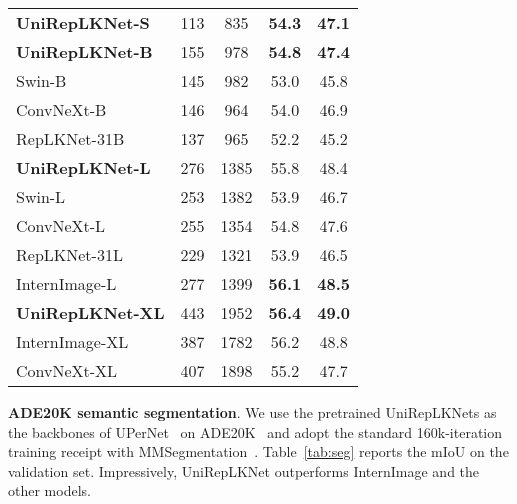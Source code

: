 \documentclass[10pt,twocolumn,letterpaper]{article}
\begin{document}
\begin{table}[t]
\begin{tabular}{l|c|c|c|c}
    \hline
    \rowcolor{gray!20}
    \textbf{UniRepLKNet-S}      &   113  &   835   &   \textbf{54.3}      &     \textbf{47.1}   \\
    \rowcolor{gray!20}
    \textbf{UniRepLKNet-B}      &   155  &   978   &    \textbf{54.8}    &   \textbf{47.4}   \\
    Swin-B~\cite{liu2021swin}      &   145   &   982     &   53.0    &   45.8    \\
    ConvNeXt-B~\cite{liu2022convnet}  &   146   &   964     &   54.0    &   46.9    \\
    RepLKNet-31B~\cite{ding2022scaling} &   137 &   965 &52.2   &   45.2    \\
    \hline
    \rowcolor{gray!20}
    \textbf{UniRepLKNet-L}      &   276  &   1385  & {55.8}   &   {48.4}      \\
    Swin-L~\cite{liu2021swin}  &   253 &   1382    &   53.9    &   46.7    \\
    ConvNeXt-L~\cite{liu2022convnet}  &  255 &1354   &   54.8    &   47.6    \\
    RepLKNet-31L~\cite{ding2022scaling}    &   229 &1321   &   53.9    &   46.5    \\
    InternImage-L~\cite{wang2023internimage}   &   277   &   1399     &\textbf{56.1}   &   \textbf{48.5}   \\
    \hline
    \rowcolor{gray!20}
    \textbf{UniRepLKNet-XL}  &   443  &   1952   &   \textbf{56.4}    &   \textbf{49.0}   \\
    InternImage-XL~\cite{wang2023internimage}  &   387    &   1782  & 56.2 &   48.8  \\
    ConvNeXt-XL~\cite{liu2022convnet} &   407   &   1898    &   55.2    &   47.7     \\
    \hline
\end{tabular}
    \label{tab:det}
    \vspace{-0.1in}
\end{table}

 
\noindent\textbf{ADE20K semantic segmentation}. We use the pretrained UniRepLKNets as the backbones of UPerNet~\cite{xiao2018unified} on ADE20K~\cite{zhou2019semantic} and adopt the standard 160k-iteration training receipt with MMSegmentation~\cite{mmseg2020}. Table~\ref{tab:seg} reports the mIoU on the validation set. Impressively, UniRepLKNet outperforms InternImage and the other models. 
\end{document}
